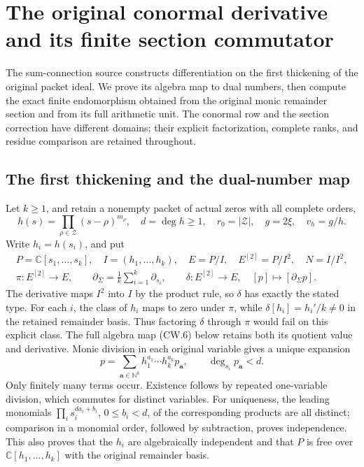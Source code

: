\section{The original conormal derivative and its finite section commutator}
\label{sec:conormal-finite-weyl}

The sum-connection source constructs differentiation on the first
thickening of the original packet ideal.  We prove its algebra map
to dual numbers, then compute the exact finite endomorphism obtained
from the original monic remainder section and from its full arithmetic
unit.  The conormal row and the section correction have different
domains; their explicit factorization, complete ranks, and residue
comparison are retained throughout.

\subsection{The first thickening and the dual-number map}

Let \(k\ge1\), and retain a nonempty packet of actual zeros with all
complete orders,
\[
 h(s)=\prod_{\rho\in\mathcal Z}(s-\rho)^{m_\rho},\quad
 d=\deg h\ge1,\quad r_0=|\mathcal Z|,\quad g=2\xi,\quad v_h=g/h.
 \tag{CW.1}
\]
Write \(h_i=h(s_i)\), and put
\[
 \begin{gathered}
 P=\mathbb C[s_1,\ldots,s_k],\quad I=(h_1,\ldots,h_k),\quad
 E=P/I,\quad E^{[2]}=P/I^2,\quad N=I/I^2,\\
 \pi:E^{[2]}\to E,\qquad
 \partial_\Sigma=\frac1k\sum_{i=1}^k\partial_{s_i},\qquad
 \delta:E^{[2]}\to E,\quad [p]\mapsto[\partial_\Sigma p].
 \end{gathered}                                                    \tag{CW.2}
\]
The derivative maps \(I^2\) into \(I\) by the product rule, so
\(\delta\) has exactly the stated type.
For each \(i\), the class of \(h_i\) maps to zero under
\(\pi\), while \(\delta[h_i]=h_i'/k\ne0\) in the retained
remainder basis.  Thus factoring \(\delta\) through \(\pi\)
would fail on this explicit class.  The full algebra map
(CW.6) below retains both its quotient value and derivative.
Monic division in each original variable gives a unique expansion
\[
 p=\sum_{\mathbf a\in\mathbb N^k}
     h_1^{a_1}\cdots h_k^{a_k}p_{\mathbf a},\qquad
 \deg_{s_i}p_{\mathbf a}<d .
 \tag{CW.3}
\]
Only finitely many terms occur.  Existence follows by repeated
one-variable division, which commutes for distinct variables.
For uniqueness, the leading monomials
\(\prod_i s_i^{da_i+b_i}\), \(0\le b_i<d\), of the
corresponding products are all distinct; comparison in a monomial
order, followed by subtraction, proves independence.
This also proves that the \(h_i\) are algebraically independent
and that \(P\) is free over \(\mathbb C[h_1,\ldots,h_k]\)
with the original remainder basis.

